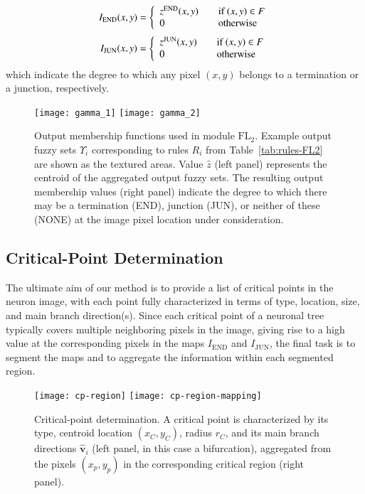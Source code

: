 \documentclass[twocolumn,natbib]{svjour3}
\begin{document}
\begin{equation}
I_{\textrm{END}}(x,y)=\left\{
\begin{array}{l@{\qquad}l}
z^{\textrm{END}}(x,y) & \textrm{if}\ (x,y)\in F \\
0 & \textrm{otherwise}
\end{array}
\right.
\end{equation}
\begin{equation}
I_{\textrm{JUN}}(x,y)=\left\{
\begin{array}{l@{\qquad}l}
z^{\textrm{JUN}}(x,y) & \textrm{if}\ (x,y)\in F \\
0 & \textrm{otherwise}
\end{array}
\right.
\end{equation}
which indicate the degree to which any pixel $(x,y)$ belongs to a termination or a junction, respectively.

\begin{figure}[!t]
\centering
\texttt{[image: gamma\_1]}\hfill
\texttt{[image: gamma\_2]}
\caption{Output membership functions used in module $\mathrm{FL}_{2}$. Example output fuzzy sets $\Upsilon_{\!i}$ corresponding to rules $R_i$ from Table~\ref{tab:rules-FL2} are shown as the textured areas. Value $\hat{z}$ (left panel) represents the centroid of the aggregated output fuzzy sets. The resulting output membership values (right panel) indicate the degree to which there may be a termination (END), junction (JUN), or neither of these (NONE) at the image pixel location under consideration.}
\label{fig:fuzzy-sets-FL2}
\end{figure}

\subsection{Critical-Point Determination}
\label{sec:CPextraction}
The ultimate aim of our method is to provide a list of critical points in the neuron image, with each point fully characterized in terms of type, location, size, and main branch direction(s). Since each critical point of a neuronal tree typically covers multiple neighboring pixels in the image, giving rise to a high value at the corresponding pixels in the maps $I_{\textrm{END}}$ and $I_{\textrm{JUN}}$, the final task is to segment the maps and to aggregate the information within each segmented region.

\begin{figure}
\texttt{[image: cp-region]}\hfill
\texttt{[image: cp-region-mapping]}
\caption{Critical-point determination. A critical point is characterized by its type, centroid location $(x_C,y_C)$, radius $r_C$, and its main branch directions $\hat{\mathbf{v}}_i$ (left panel, in this case a bifurcation), aggregated from the pixels $(x_p,y_p)$ in the corresponding critical region (right panel).}
\label{fig:CPdet}
\end{figure}
\end{document}
